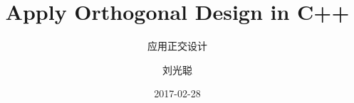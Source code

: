 \title[正交设计]
{Apply Orthogonal Design in C++}

\subtitle{应用正交设计}

\author[刘光聪]
{ 刘光聪
}


\date[2017.02]{2017-02-28}
